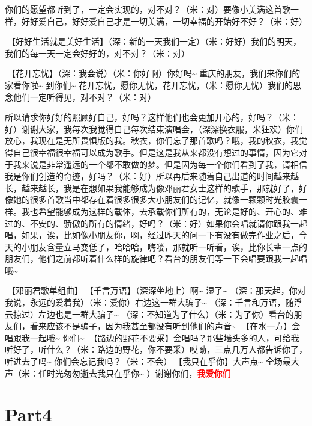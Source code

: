 \documentclass[
]{book}
\begin{document}
你们的愿望都听到了，一定会实现的，对不对？（米：对）要像小美满这首歌一样，好好爱自己，好好爱自己才是一切美满，一切幸福的开始好不好？（米：好）

🎵【好好生活就是美好生活】（深：新的一天我们一定）（米：好好）我们的明天，我们的每一天一定会好好的，对不对？（米：对）

🎵【花开忘忧】（深：我会说）（米：你好啊）你好吗\textasciitilde{} 重庆的朋友，我们来你们的家看你啦\textasciitilde{} 到你们\textasciitilde{} 花开忘忧，愿你无忧，花开忘忧，（米：愿你无忧）我们的思念他们一定听得见，对不对？（米：对）

所以请求你好好的照顾好自己，好吗？这样他们也会更加开心的，好吗？（米：好）谢谢大家，我每次我觉得自己每次结束演唱会，（深深换衣服，米狂欢）你们放心，我现在是无所畏惧版的我。秋衣，你们忘了那首歌吗？哦，我的秋衣，我觉得自己很幸福很幸福可以成为歌手。但是这是我从来都没有想过的事情，因为它对于我来说是非常遥远的一个都不敢做的梦。但是因为每一个你们看到了我，请相信我是你们创造的奇迹，好吗？（米：好）所以再后来随着自己出道的时间越来越长，越来越长，我是在想如果我能够成为像邓丽君女士这样的歌手，那就好了，好像她的很多首歌当中都存在着很多很多大小朋友们的记忆，就像一颗颗时光胶囊一样。我也希望能够成为这样的载体，去承载你们所有的，无论是好的、开心的、难过的、不安的、骄傲的所有的情绪，好吗？（米：好）如果你会唱就请你跟我一起唱，如果，诶，比如像小朋友你，啊，经过昨天的问一下有没有做完作业之后，今天的小朋友含量立马变低了，哈哈哈，嗨喽，那就听一听看，诶，比你长辈一点的朋友们，他们之前都听着什么样的旋律吧？看台的朋友们等一下会唱要跟我一起唱哦\textasciitilde{}

🎵【邓丽君歌单组曲】🎵【千言万语】（深深坐地上）啊\textasciitilde{} 湿了\textasciitilde{} （深：那天起，你对我说，永远的爱着我）（米：爱你）右边这一群大骗子\textasciitilde{} （深：千言和万语，随浮云掠过）左边也是一群大骗子\textasciitilde{} （深：不知道为了什么）（米：为了你）看台的朋友们，看来应该不是骗子，因为我甚至都没有听到他们的声音\textasciitilde{} 🎵【在水一方】会唱跟我一起哦\textasciitilde{} 你们\textasciitilde{} 🎵【路边的野花不要采】会唱吗？那些墙头多的人，可给我听好了，听什么？（米：路边的野花，你不要采）哎呦，三点几万人都告诉你了，听进去了吗\textasciitilde{} 你们会忘记我吗？（米：不会）🎵【我只在乎你】大声点\textasciitilde{} 全场最大声（米：任时光匆匆逝去我只在乎你\textasciitilde{} ）谢谢你们，\textbf{\textcolor{red}{我爱你们~} }

\section{Part4}\label{chongqing-20241007-part4}
\end{document}
